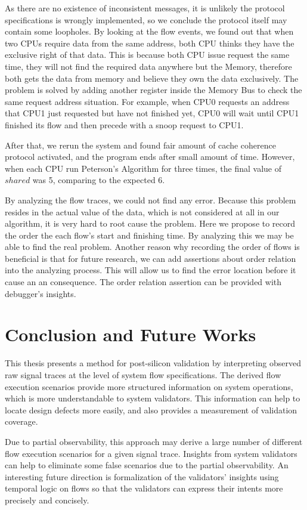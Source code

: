 \documentclass[12pt,frontmatter,copyright,thesis]{usfmanus}
\begin{document}
As there are no existence of inconsistent messages,
it is unlikely the protocol specifications is wrongly implemented,
so we conclude the protocol itself may contain some
loopholes.
By looking at the flow events, we found out that
when two CPUs require data from the same address,
both CPU thinks they have the exclusive right of that data.
This is because both CPU issue request the same time, they will not 
find the required data anywhere but the Memory, therefore
both gets the data from memory and believe they own
the data exclusively.
The problem is solved by adding another register inside the Memory Bus to check
the same request address situation. For example,
when CPU0 requests an address that CPU1
just requested but have not finished yet, CPU0 will wait until CPU1
finished its flow and then precede with a snoop request to CPU1.

 
After that, we rerun the system and found fair amount of
 cache coherence protocol activated, and
 the program ends after small amount of time. 
 However, when each CPU run Peterson's Algorithm
 for three times, the final value of $shared$ was 5, comparing to the expected 6.
 
 By analyzing the flow traces, we could not find any error. Because this problem
 resides in the actual value of the data, which is not considered at all in our algorithm,
 it is very hard to root cause the problem. Here we propose to record the order
 the each flow's start and finishing time. By analyzing this we may be able to
 find the real problem. Another reason why recording the order of flows is beneficial
 is that for future research, we can add assertions about order relation into the analyzing
 process. This will allow us to find the error location before it cause an an consequence.
 The order relation assertion can be provided with debugger's insights.
 

\chapter{Conclusion and Future Works}
This thesis presents a method for post-silicon validation by
interpreting observed raw signal traces at the level of
system flow specifications.  The derived flow execution
scenarios provide more structured information on system
operations, which is more understandable to system
validators.  This information can help to locate design
defects more easily, and also provides a measurement of
validation coverage.

Due to partial observability, this approach may derive a
large number of different flow execution scenarios for a
given signal trace.  Insights from system validators can
help to eliminate some false scenarios due to the partial
observability.  An interesting future direction is
formalization of the validators' insights using temporal
logic on flows so that the validators can express their
intents more precisely and concisely.
\end{document}
